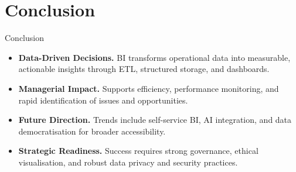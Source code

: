 \documentclass[aspectratio=169, table]{beamer}
\begin{document}
\section{Conclusion}

\begin{frame}{Conclusion}
	\vspace{20pt}
	\begin{itemize}
		\item \textbf{Data-Driven Decisions.} BI transforms operational data into measurable, actionable insights through ETL, structured storage, and dashboards.
		\item \textbf{Managerial Impact.} Supports efficiency, performance monitoring, and rapid identification of issues and opportunities.
		\item \textbf{Future Direction.} Trends include self-service BI, AI integration, and data democratisation for broader accessibility.
		\item \textbf{Strategic Readiness.} Success requires strong governance, ethical visualisation, and robust data privacy and security practices.
	\end{itemize}
\end{frame}
\end{document}
